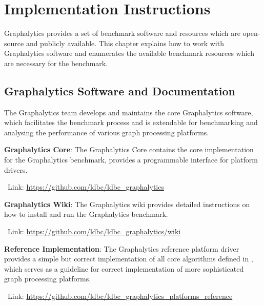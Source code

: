 \chapter{Implementation Instructions}
\label{chap:instructions}
Graphalytics provides a set of benchmark software and resources which are open-source and publicly available. This chapter explains how to work with Graphalytics software and enumerates the available benchmark resources which are necessary for the benchmark.



\section{Graphalytics Software and Documentation}\label{sec:instructions:core}
The Graphalytics team develops and maintains the core Graphalytics software, which facilitates the benchmark process and is extendable for benchmarking and analysing the performance of various graph processing platforms.

\textbf{Graphalytics Core}: The Graphalytics Core contains the core implementation for the Graphalytics benchmark, provides a programmable interface for platform drivers.

\-\ Link: \url{https://github.com/ldbc/ldbc_graphalytics}


\textbf{Graphalytics Wiki}: The Graphalytics wiki provides detailed instructions on how to install and run the Graphalytics benchmark.

\-\ Link: \url{https://github.com/ldbc/ldbc_graphalytics/wiki}




\textbf{Reference Implementation}: The Graphalytics reference platform driver provides a simple but correct implementation of all core algorithms defined in , which serves as a guideline for correct implementation of more sophisticated graph processing platforms.

\-\ Link: \url{https://github.com/ldbc/ldbc_graphalytics_platforms_reference}









